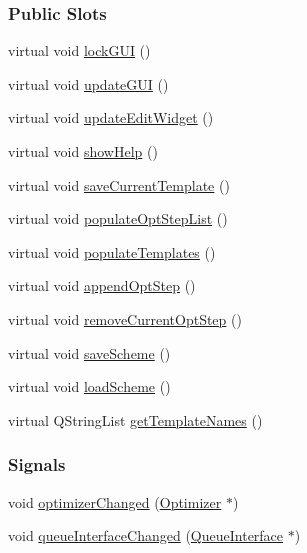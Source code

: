 \subsubsection*{Public Slots}
\begin{DoxyCompactItemize}
\item 
virtual void \hyperlink{classGlobalSearch_1_1AbstractEditTab_a450c63567ac48b329469b2c380ff46a4}{lock\+G\+U\+I} ()
\item 
virtual void \hyperlink{classGlobalSearch_1_1AbstractEditTab_ae34c4af22aa9a04eebc3a4a4a284da53}{update\+G\+U\+I} ()
\item 
virtual void \hyperlink{classGlobalSearch_1_1AbstractEditTab_a19292ce55de31e989deee2b166c188d1}{update\+Edit\+Widget} ()
\item 
virtual void \hyperlink{classGlobalSearch_1_1AbstractEditTab_a19d5d4e568a67e46cc6431ba8c4199d0}{show\+Help} ()
\item 
virtual void \hyperlink{classGlobalSearch_1_1AbstractEditTab_a27965a0c57832b480b6663e786950e7d}{save\+Current\+Template} ()
\item 
virtual void \hyperlink{classGlobalSearch_1_1AbstractEditTab_ac973d18ed4a3c2d4ed8392a1fc8bed10}{populate\+Opt\+Step\+List} ()
\item 
virtual void \hyperlink{classGlobalSearch_1_1AbstractEditTab_ae37c49f896c0d668d48ef9bcae90dcf7}{populate\+Templates} ()
\item 
virtual void \hyperlink{classGlobalSearch_1_1AbstractEditTab_ae86997d35f9d05458638766b4378b92d}{append\+Opt\+Step} ()
\item 
virtual void \hyperlink{classGlobalSearch_1_1AbstractEditTab_a5507b5aaa5021085a57d1be72b71d975}{remove\+Current\+Opt\+Step} ()
\item 
virtual void \hyperlink{classGlobalSearch_1_1AbstractEditTab_a5ff01d9316ca927b7cf75d7a6720a793}{save\+Scheme} ()
\item 
virtual void \hyperlink{classGlobalSearch_1_1AbstractEditTab_a0b0d6a412e3b73113a0e84f6a86c0a8c}{load\+Scheme} ()
\item 
virtual Q\+String\+List \hyperlink{classGlobalSearch_1_1AbstractEditTab_a78c72c6174761b4c95eb4d512042120c}{get\+Template\+Names} ()
\end{DoxyCompactItemize}
\subsubsection*{Signals}
\begin{DoxyCompactItemize}
\item 
void \hyperlink{classGlobalSearch_1_1AbstractEditTab_a439d2f12f3121c30adf8f3375b631dee}{optimizer\+Changed} (\hyperlink{classGlobalSearch_1_1Optimizer}{Optimizer} $\ast$)
\item 
void \hyperlink{classGlobalSearch_1_1AbstractEditTab_a069c8370545d5fbde59b7634ba6bb621}{queue\+Interface\+Changed} (\hyperlink{classGlobalSearch_1_1QueueInterface}{Queue\+Interface} $\ast$)
\end{DoxyCompactItemize}
